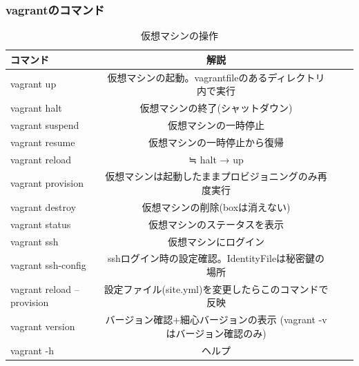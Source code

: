 \subsubsection*{vagrantのコマンド}
\begin{table}[htb]
	\begin{center}
		 \caption{仮想マシンの操作}
 			\begin{tabular}{|l|c|r||r|} \hline
				コマンド & 解説  \\ \hline \hline
				vagrant up & 仮想マシンの起動。vagrantfileのあるディレクトリ内で実行  \\ \hline
				vagrant halt & 仮想マシンの終了(シャットダウン)  \\ \hline
				vagrant suspend & 仮想マシンの一時停止  \\ \hline
				vagrant resume & 仮想マシンの一時停止から復帰  \\ \hline
				vagrant reload & ≒ halt → up　\\ \hline
				vagrant provision & 仮想マシンは起動したままプロビジョニングのみ再度実行  \\ \hline
				vagrant destroy & 仮想マシンの削除(boxは消えない)  \\ \hline
				vagrant status & 仮想マシンのステータスを表示  \\ \hline
				vagrant ssh & 仮想マシンにログイン  \\ \hline
				vagrant ssh-config & sshログイン時の設定確認。IdentityFileは秘密鍵の場所  \\ \hline
				vagrant reload --provision & 設定ファイル(site.yml)を変更したらこのコマンドで反映  \\ \hline
				vagrant version & バージョン確認+細心バージョンの表示 (vagrant -vはバージョン確認のみ)  \\ \hline
				vagrant -h & ヘルプ  \\ \hline
			\end{tabular}
	 \end{center}
\end{table}

